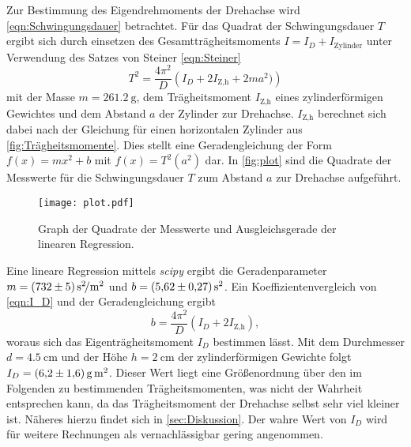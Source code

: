 Zur Bestimmung des Eigendrehmoments der Drehachse wird \autoref{eqn:Schwingungsdauer} betrachtet. Für das Quadrat der Schwingungsdauer $T$ ergibt sich
durch einsetzen des Gesamtträgheitsmoments $I = I_D + I_\text{Zylinder}$ unter Verwendung des Satzes von Steiner \eqref{eqn:Steiner}
\begin{equation}
  \label{eqn:I_D}
  T^2 = \frac{4\pi^2}{D}\left(I_D + 2I_\text{Z,h} + 2 m a^2) \right)
\end{equation}
mit der Masse $m = \qty{261.2}{\gram}$, dem Trägheitsmoment $I_\text{Z,h}$ eines zylinderförmigen Gewichtes und dem Abstand $a$ der Zylinder zur Drehachse. $I_\text{Z,h}$
berechnet sich dabei nach der Gleichung für einen horizontalen Zylinder aus \autoref{fig:Trägheitsmomente}.
Dies stellt eine Geradengleichung der Form $f(x) = mx^2 +b$ mit $f(x) = T^2(a^2)$ dar. In \autoref{fig:plot} sind die 
Quadrate der Messwerte für die Schwingungsdauer $T$ zum Abstand $a$ zur Drehachse aufgeführt. 
\begin{figure}
  \centering
  \texttt{[image: plot.pdf]}
  \caption{Graph der Quadrate der Messwerte und Ausgleichsgerade der linearen Regression. \cite{matplotlib}}
  \label{fig:plot}
\end{figure}
Eine lineare Regression mittels \textit{scipy} \cite{scipy} ergibt die Geradenparameter $m = \qty{732 +- 5}{\second\squared\per\metre\squared}$ und 
$b = \qty{5.62 +- 0.27}{\second\squared}$. Ein Koeffizientenvergleich von \autoref{eqn:I_D} und der Geradengleichung ergibt 
\begin{equation}
  b = \frac{4\pi^2}{D}(I_D + 2I_\text{Z,h}),
\end{equation}
woraus sich das Eigenträgheitsmoment $I_D$ bestimmen lässt. Mit dem Durchmesser $d = \qty{4.5}{\centi\metre}$ und der Höhe $h = \qty{2}{\centi\metre}$ der zylinderförmigen
Gewichte folgt $I_D = \qty{6.2 +- 1.6}{\gram\square\metre}$. Dieser Wert liegt eine Größenordnung über den im Folgenden zu bestimmenden Trägheitsmomenten, was nicht der 
Wahrheit entsprechen kann, da das Trägheitsmoment der Drehachse selbst sehr viel kleiner ist. Näheres hierzu findet sich in \autoref{sec:Diskussion}. Der wahre Wert von
$I_D$ wird für weitere Rechnungen als vernachlässigbar gering angenommen.
